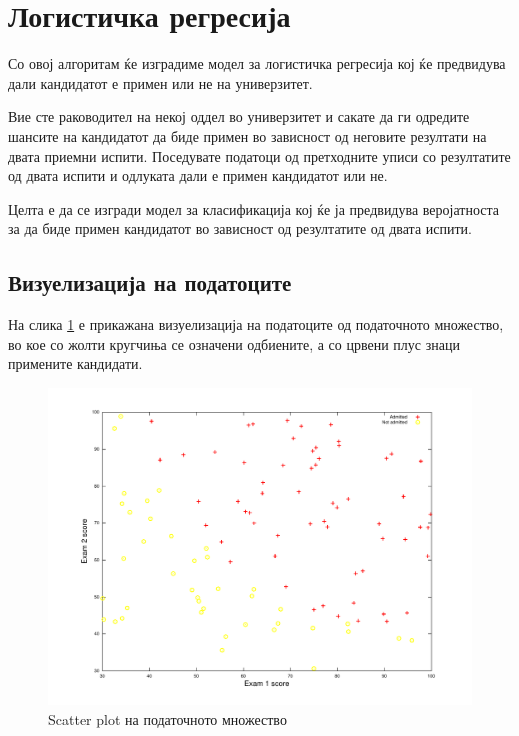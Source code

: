 \section{Логистичка регресија}

Со овој алгоритам ќе изградиме модел за логистичка регресија кој ќе предвидува
дали кандидатот е примен или не на универзитет.

Вие сте раководител на некој оддел во универзитет и сакате да ги одредите
шансите на кандидатот да биде примен во зависност од неговите резултати на двата
приемни испити. Поседувате податоци од претходните уписи со резултатите од двата
испити и одлуката дали е примен кандидатот или не.

Целта е да се изгради модел за класификација кој ќе ја предвидува веројатноста
за да биде примен кандидатот во зависност од резултатите од двата испити.

\subsection{Визуелизација на податоците}
На слика \ref{fig:plot2} е прикажана визуелизација на податоците од податочното
множество, во кое со жолти кругчиња се означени одбиените, а со црвени плус
знаци примените кандидати.

\begin{figure}[htb]
\centering
\includegraphics[width=.9\textwidth]{src/logisticRegression/data}
\caption{Scatter plot на податочното множество}
\label{fig:plot2}
\end{figure}



